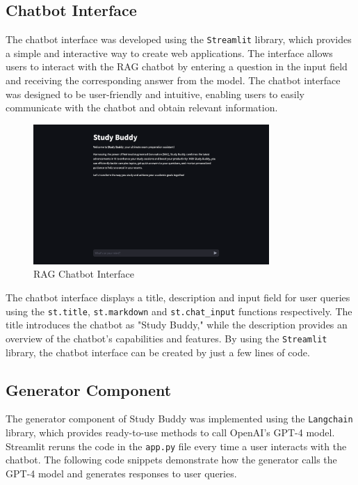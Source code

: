     \subsection{Chatbot Interface}
        The chatbot interface was developed using the \texttt{Streamlit} library, which provides a simple and interactive way to create web applications. The interface allows users to interact with the RAG chatbot by entering a question in the input field and receiving the corresponding answer from the model. The chatbot interface was designed to be user-friendly and intuitive, enabling users to easily communicate with the chatbot and obtain relevant information.
        \begin{figure}[H]
            \centering
            \includegraphics[width=0.8\textwidth]{figs/interface.png}
            \caption{RAG Chatbot Interface}
            \label{fig:chatbot_interface}
        \end{figure}
            
            The chatbot interface displays a title, description and input field for user queries using the \texttt{st.title}, \texttt{st.markdown} and \texttt{st.chat\_input} functions respectively. The title introduces the chatbot as "Study Buddy," while the description provides an overview of the chatbot's capabilities and features. By using the \texttt{Streamlit} library, the chatbot interface can be created by just a few lines of code.

\subsection{Generator Component}
The generator component of Study Buddy was implemented using the \texttt{Langchain} library, which provides ready-to-use methods to call OpenAI's GPT-4 model. Streamlit reruns the code in the \texttt{app.py} file every time a user interacts with the chatbot. The following code snippets demonstrate how the generator calls the GPT-4 model and generates responses to user queries.


